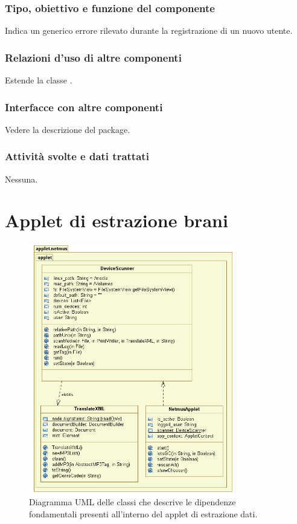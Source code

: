 \subsubsection*{Tipo, obiettivo e funzione del componente}
Indica un generico errore rilevato durante la registrazione di un nuovo utente.
\subsubsection*{Relazioni d'uso di altre componenti}
Estende la classe .
\subsubsection*{Interfacce con altre componenti}
Vedere la descrizione del package.
\subsubsection*{Attivit\`a svolte e dati trattati}
Nessuna.


\section{Applet di estrazione brani}

\begin{figure}[!h]
  \centering
  \includegraphics[width=9cm]{img/DP/applet.png}
\caption{Diagramma UML delle classi che descrive le dipendenze
fondamentali presenti all'interno del applet di estrazione dati.}
\end{figure}

